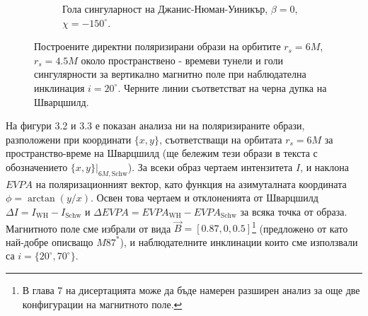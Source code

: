 \documentclass[12pt]{article}
\numberwithin{equation}{section}
\numberwithin{figure}{section}
\begin{document}
\begin{figure}[!htb]
\begin{subfigure}{7cm}
			\caption{Гола сингуларност на Джанис-Нюман-Уиникър, $\beta = 0$, $\chi = -150^\circ$.}
		\end{subfigure}
		\caption[Поляризирани директни образи около пространствено - времеви тунели и голи сингулярности за вертикално магнитно поле.]{\small Построените директни поляризирани образи на орбитите $r_s = 6M$, $r_s = 4.5M$ около пространствено - времеви тунели  и голи сингулярности за вертикално магнитно поле при наблюдателна инклинация $i = 20^\circ$. Черните линии съответстват на черна дупка на Шварцшилд.} 
		\label{pol_vert_field}
	\end{figure}
	
	На фигури 3.2 и 3.3 е показан анализа ни на поляризираните образи, разположени при координати $\{x,y\}$, съответстващи на орбитата $r_s = 6M$ за пространство-време на Шварцшилд (ще бележим тези образи в текста с обозначението $\{x,y\}\vert_{6M, \text{Schw}}$). За всеки образ чертаем интензитета $I$, и наклона $EVPA$ на поляризационният вектор, като функция на азимуталната координата $\phi = \arctan(y / x)$. Освен това чертаем и отклоненията от Шварцшилд $\Delta I = I_{\text{WH}} - I_{\text{Schw}}$ и $\Delta EVPA = EVPA_\text{WH} - EVPA_\text{Schw}$ за всяка точка от образа. Магнитното поле сме избрали от вида $\vec{B} = [0.87, 0, 0.5]$\footnote{В глава 7 на дисертацията може да бъде намерен разширен анализ за още две конфигурации на магнитното поле.} (предложено от \cite{Narayan2021} като най-добре описващо $M87^*$), и наблюдателните инклинации които сме използвали са $i = \{20^\circ, 70^\circ\}$.
	
	
	\newpage
	
\end{document}
